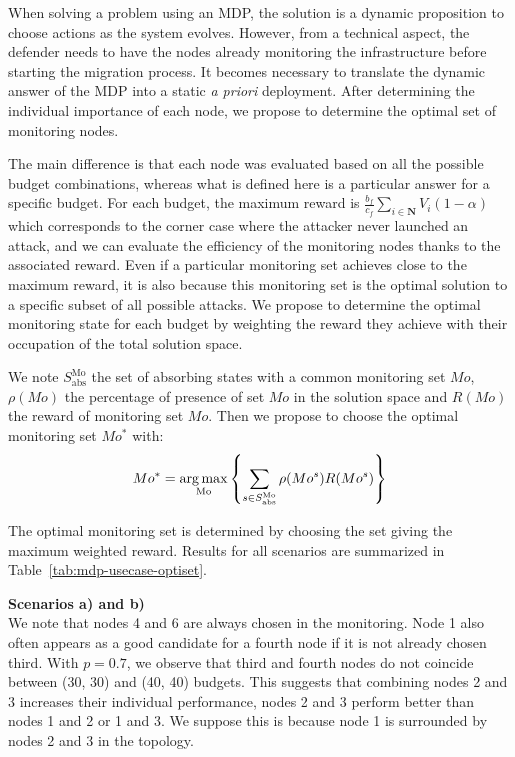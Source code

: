 When solving a problem using an MDP, the solution is a dynamic proposition to choose actions as the system evolves.
However, from a technical aspect, the defender needs to have the nodes already monitoring the infrastructure before starting the migration process.
It becomes necessary to translate the dynamic answer of the MDP into a static \textit{a priori} deployment.
After determining the individual importance of each node, we propose to determine the optimal set of monitoring nodes.

The main difference is that each node was evaluated based on all the possible budget combinations, whereas what is defined here is a particular answer for a specific budget.
For each budget, the maximum reward is $\frac{b_f}{c_f} \sum\limits_{i \in \textbf{N}}V_i(1-\alpha) $ which corresponds to the corner case where the attacker never launched an attack, and we can evaluate the efficiency of the  monitoring nodes thanks to the associated reward.
Even if a particular monitoring set achieves close to the maximum reward, it is also because this monitoring set is the optimal solution to a specific subset of all possible attacks.
We propose to determine the optimal monitoring state for each budget by weighting the reward they achieve with their occupation of the total solution space.

We note $S^{\text{Mo}}_{\text{abs}}$ the set of absorbing states with a common  monitoring set $Mo$, $\rho(Mo)$ the percentage of presence of set $Mo$ in the solution space and $R(Mo)$ the reward of monitoring set $Mo$.
Then we propose to choose the optimal monitoring set $Mo^*$ with:
\begin{equation}
    Mo^* = \operatorname*{arg\,max}\limits_{\text{Mo}} \left \{\sum\limits_{s \in S^{\text{Mo}}_{\text{abs}}}\rho(Mo^s)R(Mo^s) \right \}
\end{equation}

The optimal monitoring set is determined by choosing the set giving the maximum weighted reward.
Results for all scenarios are summarized in Table~\ref{tab:mdp-usecase-optiset}. 



\textbf{Scenarios a) and b)\\}
We note that nodes 4 and 6 are always chosen in the monitoring.
Node 1 also often appears as a good candidate for a fourth node if it is not already chosen third.
With $p=0.7$, we observe that third and fourth nodes do not coincide between (30, 30) and (40, 40) budgets.
This suggests that combining nodes 2 and 3 increases their individual performance, \ie nodes 2 and 3 perform better than nodes 1 and 2 or 1 and 3.
We suppose this is because node 1 is surrounded by nodes 2 and 3 in the topology.

